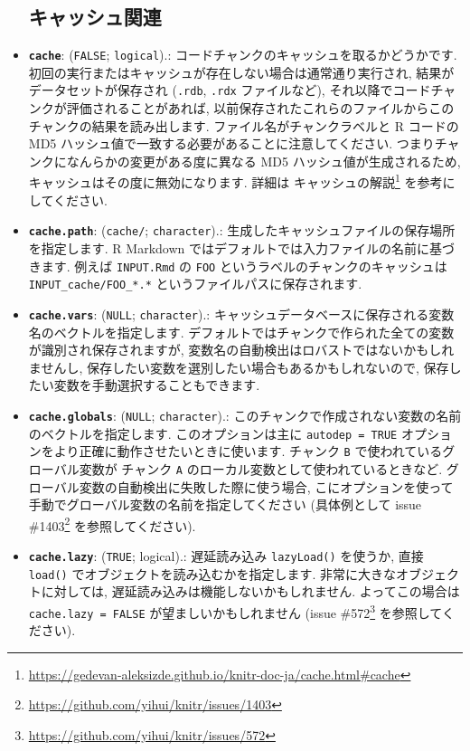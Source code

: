 \documentclass[
  11pt,
  lualatex,
  ja=standard]{bxjsreport}
\renewcommand{\href}[2]{#2\footnote{\url{#1}}}
\begin{document}
\begin{itemize}
{  \subsection{キャッシュ関連}\label{cache-options}}
\item
  \textbf{\texttt{cache}}: (\texttt{FALSE}; \texttt{logical}).: コードチャンクのキャッシュを取るかどうかです. 初回の実行またはキャッシュが存在しない場合は通常通り実行され, 結果がデータセットが保存され (\texttt{.rdb}, \texttt{.rdx} ファイルなど), それ以降でコードチャンクが評価されることがあれば, 以前保存されたこれらのファイルからこのチャンクの結果を読み出します. ファイル名がチャンクラベルと R コードの MD5 ハッシュ値で一致する必要があることに注意してください. つまりチャンクになんらかの変更がある度に異なる MD5 ハッシュ値が生成されるため, キャッシュはその度に無効になります. 詳細は \href{https://gedevan-aleksizde.github.io/knitr-doc-ja/cache.html\#cache}{キャッシュの解説} を参考にしてください.
\item
  \textbf{\texttt{cache.path}}: (\texttt{\textquotesingle{}cache/\textquotesingle{}}; \texttt{character}).: 生成したキャッシュファイルの保存場所を指定します. R Markdown ではデフォルトでは入力ファイルの名前に基づきます. 例えば \texttt{INPUT.Rmd} の \texttt{FOO} というラベルのチャンクのキャッシュは \texttt{INPUT\_cache/FOO\_*.*} というファイルパスに保存されます.
\item
  \textbf{\texttt{cache.vars}}: (\texttt{NULL}; \texttt{character}).: キャッシュデータベースに保存される変数名のベクトルを指定します. デフォルトではチャンクで作られた全ての変数が識別され保存されますが, 変数名の自動検出はロバストではないかもしれませんし, 保存したい変数を選別したい場合もあるかもしれないので, 保存したい変数を手動選択することもできます.
\item
  \textbf{\texttt{cache.globals}}: (\texttt{NULL}; \texttt{character}).: このチャンクで作成されない変数の名前のベクトルを指定します. このオプションは主に \texttt{autodep = TRUE} オプションをより正確に動作させたいときに使います. チャンク \texttt{B} で使われているグローバル変数が チャンク \texttt{A} のローカル変数として使われているときなど. グローバル変数の自動検出に失敗した際に使う場合, こにオプションを使って手動でグローバル変数の名前を指定してください (具体例として issue \href{https://github.com/yihui/knitr/issues/1403}{\#1403} を参照してください).
\item
  \textbf{\texttt{cache.lazy}}: (\texttt{TRUE}; logical).: 遅延読み込み \texttt{lazyLoad()} を使うか, 直接 \texttt{load()} でオブジェクトを読み込むかを指定します. 非常に大きなオブジェクトに対しては, 遅延読み込みは機能しないかもしれません. よってこの場合は \texttt{cache.lazy = FALSE} が望ましいかもしれません (issue \href{https://github.com/yihui/knitr/issues/572}{\#572} を参照してください).

\end{itemize}
\end{document}

